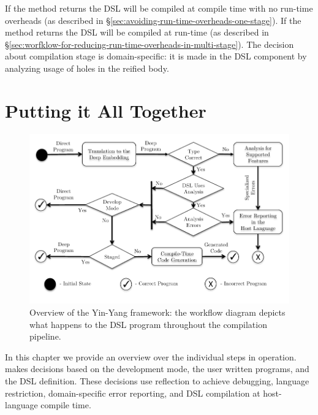 If the method  returns  the DSL will be compiled at compile time with no run-time overheads (as described in \S \ref{sec:avoiding-run-time-overheads-one-stage}). If the method returns  the DSL will be compiled at run-time (as described in \S \ref{sec:worfklow-for-reducing-run-time-overheads-in-multi-stage}). The decision about compilation stage is domain-specific: it is made in the DSL component by analyzing usage of holes in the reified body.




\chapter{Putting it All Together}
\label{sec:putting-it-all-together}

\begin{figure}[!ht]
\centering
\includegraphics{diagrams/workflow.pdf}
\caption{Overview of the Yin-Yang framework: the workflow diagram depicts what
happens to the DSL program throughout the compilation pipeline.}
\label{fig:workflow}
\end{figure}

In this chapter we provide an overview over the individual steps in \yy operation. \yy makes
 decisions based on the development mode, the user written programs, and the DSL definition. These
 decisions use reflection to achieve debugging, language restriction, domain-specific error reporting, and
 DSL compilation at host-language compile time.


